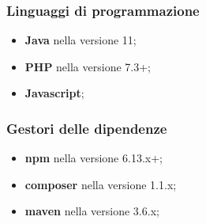 	\subsubsection{Linguaggi di programmazione}
		\begin{itemize}
			\item \textbf{Java} nella versione 11;
			\item \textbf{PHP} nella versione 7.3+;
			\item \textbf{Javascript};
		\end{itemize}
	\subsubsection{Gestori delle dipendenze}
		\begin{itemize}
			\item \textbf{npm} nella versione 6.13.x+;
			\item \textbf{composer} nella versione 1.1.x;
			\item \textbf{maven} nella versione 3.6.x; 
		\end{itemize}
